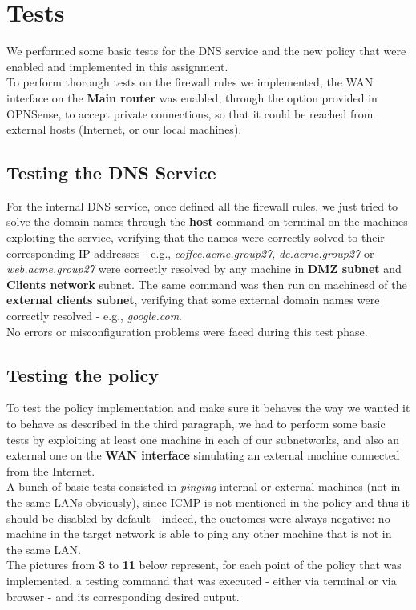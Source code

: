\section{Tests}
We performed some basic tests for the DNS service and the new policy that were enabled and implemented in this assignment.\\
To perform thorough tests on the firewall rules we implemented, the WAN interface on the \textbf{Main router} was enabled, through the option provided in OPNSense, to accept private connections, so that it could be reached from external hosts (Internet, or our local machines).\\

\subsection{Testing the DNS Service}
For the internal DNS service, once defined all the firewall rules, we just tried to solve the domain names through the \textbf{host} command on terminal on the machines exploiting the service, verifying that the names were correctly solved to their corresponding IP addresses - e.g., \textit{coffee.acme.group27}, \textit{dc.acme.group27} or \textit{web.acme.group27} were correctly resolved by any machine in \textbf{DMZ subnet} and \textbf{Clients network} subnet. The same command was then run on machinesd of the \textbf{external clients subnet}, verifying that some external domain names were correctly resolved - e.g., \textit{google.com}.\\
No errors or misconfiguration problems were faced during this test phase.

\subsection{Testing the policy}
To test the policy implementation and make sure it behaves the way we wanted it to behave as described in the third paragraph, we had to perform some basic tests by exploiting at least one machine in each of our subnetworks, and also an external one on the \textbf{WAN interface} simulating an external machine connected from the Internet.\\
A bunch of basic tests consisted in \textit{pinging} internal or external machines (not in the same LANs obviously), since ICMP is not mentioned in the policy and thus it should be disabled by default - indeed, the ouctomes were always negative: no machine in the target network is able to ping any other machine that is not in the same LAN.\\
The pictures from \textbf{3} to \textbf{11} below represent, for each point of the policy that was implemented, a testing command that was executed - either via terminal or via browser - and its corresponding desired output.\\

